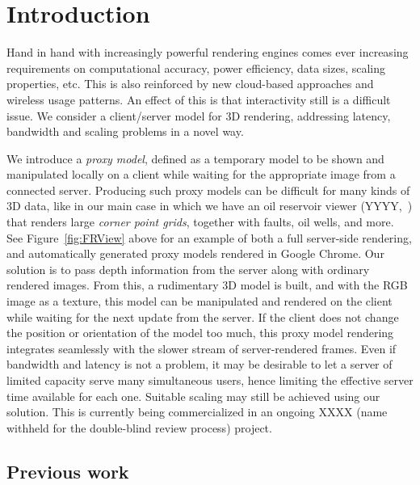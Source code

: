 \documentclass[10pt,conference,compsocconf]{IEEEtran}
\begin{document}
\section{Introduction}

Hand in hand with increasingly powerful rendering engines comes ever increasing
requirements on computational accuracy, power efficiency, data sizes, scaling
properties, etc. This is also reinforced by new cloud-based approaches and
wireless usage patterns. An effect of this is that interactivity still is a
difficult issue. We consider a client/server model for 3D rendering, addressing
latency, bandwidth and scaling problems in a novel way.

We introduce a {\em proxy model}, defined as a temporary model to be shown and
manipulated locally on a client while waiting for the appropriate image from a
connected server. Producing such proxy models can be difficult for many kinds of
3D data, like in our main case in which we have an oil reservoir viewer
(YYYY,~\cite{cloudviz}) that renders large {\em corner point grids}, together
with faults, oil wells, and more. See Figure~\ref{fig:FRView} above for an
example of both a full server-side rendering, and automatically generated proxy
models rendered in Google Chrome.
%
Our solution is to pass depth information from the server along with ordinary
rendered images. From this, a rudimentary 3D model is built, and with the RGB
image as a texture, this model can be manipulated and rendered on the client
while waiting for the next update from the server. If the client does not change
the position or orientation of the model too much, this proxy model rendering
integrates seamlessly with the slower stream of server-rendered frames.
%
Even if bandwidth and latency is not a problem, it may be desirable to let a
server of limited capacity serve many simultaneous users, hence limiting the
effective server time available for each one. Suitable scaling may still be
achieved using our solution. This is currently being commercialized in an
ongoing XXXX (name withheld for the double-blind review process) project.


\subsection{Previous work}
\label{sec:prevWork}
\end{document}
